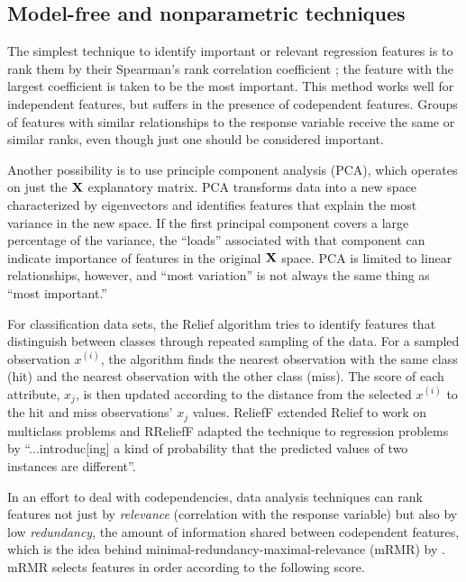 \documentclass[11pt]{article}
\renewcommand{\xi}{x^{(i)}}
\begin{document}
\subsection{Model-free and nonparametric techniques}

The simplest technique to identify important or relevant regression features is to rank them by their Spearman's rank correlation coefficient \citep{spearmans}; the feature with the largest coefficient is taken to be the most important. This method works well for independent features, but suffers in the presence of codependent features.   Groups of features with similar relationships to the response variable receive the same or similar ranks, even though just one should be considered important.

Another possibility is to use principle component analysis (PCA), which operates on just the $\bf X$ explanatory matrix. PCA transforms data into a new space characterized by eigenvectors and identifies features that explain the most variance in the new space. If the first principal component covers a large percentage of the variance, the ``loads'' associated with that component can indicate importance of features in the original $\bf X$ space. PCA is limited to linear relationships, however, and ``most variation'' is not always the same thing as ``most important.''

For classification data sets, the Relief algorithm \citep{relief} tries to identify features that distinguish between classes through repeated sampling of the data. For a sampled observation $\xi$, the algorithm finds the nearest observation with the same class (hit) and the nearest observation with the other class (miss). The score of each attribute, $x_j$, is then updated according to the distance from the selected $\xi$ to the hit and miss observations'  $x_j$ values. ReliefF \citep{ReliefF} extended Relief to work on multiclass problems and RReliefF \citep{RReliefF} adapted the technique to regression problems by ``...introduc[ing] a kind of probability that the predicted values of two instances are different''.

In an effort to deal with codependencies, data analysis techniques can rank features not just by {\em relevance} (correlation with the response variable) but also by low {\em redundancy}, the amount of information shared between codependent features, which is the idea behind minimal-redundancy-maximal-relevance (mRMR) by \citet{mRMR}. mRMR selects features in order according to the following score.
\end{document}

